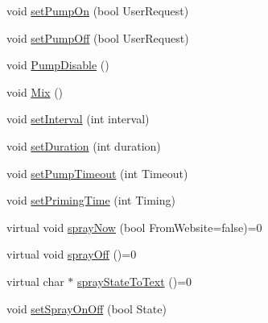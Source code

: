 \begin{DoxyCompactItemize}
void \hyperlink{class_aeroponics_ae4d0324ae9193294ed4a1ca5ab247537}{set\+Pump\+On} (bool User\+Request)
\item 
void \hyperlink{class_aeroponics_a24561429d2ee5cf75f86edbe6e0a1d80}{set\+Pump\+Off} (bool User\+Request)
\item 
void \hyperlink{class_aeroponics_a235ada2ee2e5ab79542da63e3fc70cb5}{Pump\+Disable} ()
\item 
void \hyperlink{class_aeroponics_a509f52009146d740a519154b5beca6ff}{Mix} ()
\item 
void \hyperlink{class_aeroponics_a769b673b25fad588fd2dc013f5a62132}{set\+Interval} (int interval)
\item 
void \hyperlink{class_aeroponics_a0414c6a5be2ff2da7d88e83cc2364110}{set\+Duration} (int duration)
\item 
void \hyperlink{class_aeroponics_ac0363ff5470e85f5acda1842a616dd41}{set\+Pump\+Timeout} (int Timeout)
\item 
void \hyperlink{class_aeroponics_ad9568506941f5de8d849eae4daca1bd7}{set\+Priming\+Time} (int Timing)
\item 
virtual void \hyperlink{class_aeroponics_aecda76aae20ce45fd9a080770cf07e56}{spray\+Now} (bool From\+Website=false)=0
\item 
virtual void \hyperlink{class_aeroponics_a961b5818322eb6d0268d2f2f4763768e}{spray\+Off} ()=0
\item 
virtual char $\ast$ \hyperlink{class_aeroponics_aa79435aaa49a563d41ae092ec3e87e06}{spray\+State\+To\+Text} ()=0
\item 
void \hyperlink{class_aeroponics_a459d83fc32d3369938be2953138c9b96}{set\+Spray\+On\+Off} (bool State)
\end{DoxyCompactItemize}
